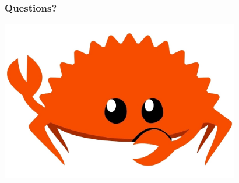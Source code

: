 \documentclass[aspectratio=1610,t]{beamer}
\begin{document}

\begin{frame}
\frametitle{Questions?}
\begin{center}
\includegraphics[width=\textwidth,height=7cm,keepaspectratio]{images/crab.jpg}
\end{center}
\end{frame}

\end{document}
